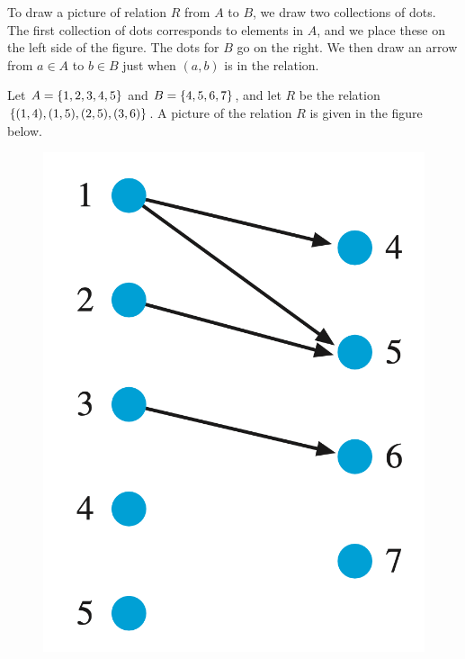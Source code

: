 \documentclass[10pt]{beamer}
\begin{document}
\begin{frame}

\begin{myredbox}[title=Drawing relations from $A$ to $B$]
 To draw a picture of relation $R$ from $A$ to $B$, we draw two collections of dots. The first collection of dots corresponds to elements in $A$, and we place these on the left side of the figure. The dots for $B$ go on the right. We then draw an arrow from $a \in A$ to $b \in B$ just when $(a,b)$ is in the relation.  
 \end{myredbox}
 
\begin{mygreenbox}[title=Example]
Let $A = \{ {1,2,3,4,5} \}$ and $B=\{ {4,5,6,7} \}$, and let $R$ be the relation $\{ {(1,4),(1,5),(2,5),(3,6)} \}$.  A picture of the relation $R$ is given in the figure below.  
 
 \begin{figure}
\includegraphics[width=.2\textwidth]{images/relations} 
\end{figure}

\end{mygreenbox}
 


\end{frame}
\end{document}
